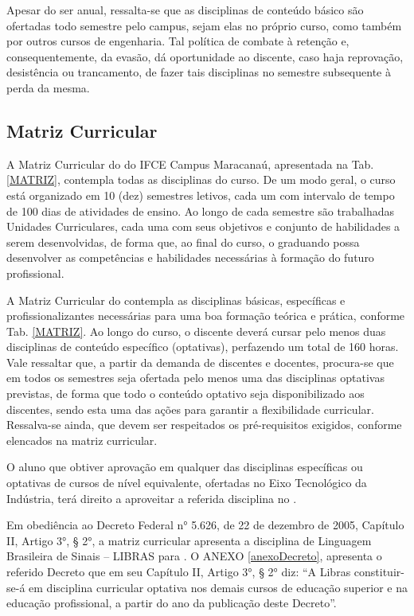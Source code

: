 Apesar do \NOMECURSO ser anual, ressalta-se que as disciplinas de conteúdo básico são ofertadas todo semestre pelo campus, sejam elas no próprio curso, como também por outros cursos de engenharia. Tal política de combate à retenção e, consequentemente, da evasão, dá oportunidade ao discente, caso haja reprovação, desistência ou trancamento, de fazer tais disciplinas no semestre subsequente à perda da mesma. 


\subsection{Matriz Curricular}

A Matriz Curricular do \NOMECURSO do IFCE Campus Maracanaú, apresentada na Tab. \ref{MATRIZ}, contempla todas as disciplinas do curso. De um modo geral, o curso está organizado em 10 (dez) semestres letivos, cada um com intervalo de tempo de 100 dias de atividades de ensino. Ao longo de cada semestre são trabalhadas Unidades Curriculares, cada uma com seus objetivos e conjunto de habilidades a serem desenvolvidas, de forma que, ao final do curso, o graduando possa desenvolver as competências e habilidades necessárias à formação do futuro profissional.

A Matriz Curricular do \NOMECURSO contempla as disciplinas básicas, específicas e profissionalizantes necessárias para uma boa formação teórica e prática, conforme Tab. \ref{MATRIZ}. Ao longo do curso, o discente deverá cursar pelo menos duas disciplinas de conteúdo específico (optativas), perfazendo um total de 160 horas. Vale ressaltar que, a partir da demanda de discentes e docentes, procura-se que em todos os semestres seja ofertada pelo menos uma das disciplinas optativas previstas, de forma que todo o conteúdo optativo seja disponibilizado aos discentes, sendo esta uma das ações para garantir a flexibilidade curricular. Ressalva-se ainda, que devem ser respeitados os pré-requisitos exigidos, conforme elencados na matriz curricular.

O aluno que obtiver aprovação em qualquer das disciplinas específicas ou optativas de cursos de nível equivalente, ofertadas no Eixo Tecnológico da Indústria, terá direito a aproveitar a referida disciplina no \NOMECURSO.

Em obediência ao Decreto Federal n° 5.626, de 22 de dezembro de 2005, Capítulo II, Artigo 3°, § 2°, a matriz curricular apresenta a disciplina de Linguagem Brasileira de Sinais – LIBRAS para \NOMECURSO. O ANEXO \ref{anexoDecreto}, apresenta o referido Decreto que em seu Capítulo II, Artigo 3°, § 2° diz: ``A Libras constituir-se-á em disciplina curricular optativa nos demais cursos de educação superior e na educação profissional, a partir do ano da publicação deste Decreto''.

